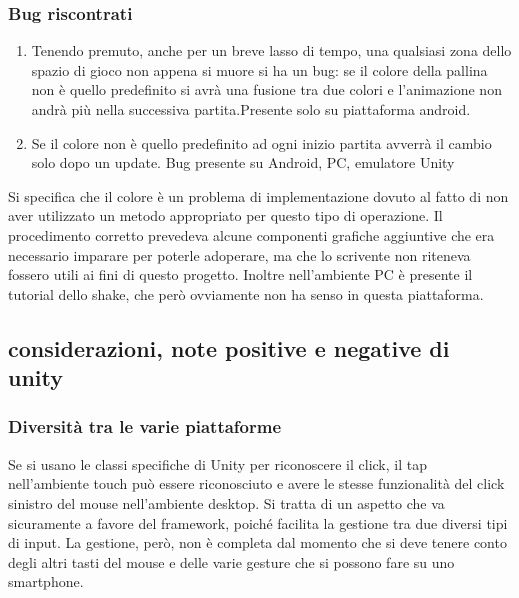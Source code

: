 \subsubsection{Bug riscontrati}
\begin{enumerate}
\item Tenendo premuto, anche per un breve lasso di tempo, una qualsiasi zona dello spazio di gioco non appena si muore si ha un bug: se il colore della pallina non è quello predefinito si avrà una fusione tra due colori e l’animazione non andrà più nella successiva partita.Presente solo su piattaforma android.
\item Se il colore non è quello predefinito ad ogni inizio partita avverrà il cambio solo dopo un update. Bug presente su Android, PC, emulatore Unity
\end{enumerate}

Si specifica che il colore è un problema di implementazione dovuto al fatto di non aver utilizzato un metodo appropriato per questo tipo di operazione. Il procedimento corretto prevedeva alcune componenti grafiche aggiuntive che era necessario imparare per poterle adoperare, ma che lo scrivente non riteneva fossero utili ai fini di questo progetto. Inoltre nell’ambiente PC è presente il tutorial dello shake, che però ovviamente non ha senso in questa piattaforma.



\subsection{considerazioni, note positive e negative di unity}

\subsubsection{Diversità tra le varie piattaforme}
Se si usano le classi specifiche di Unity per riconoscere il click, il tap nell’ambiente touch può essere riconosciuto e avere le stesse funzionalità del click sinistro del mouse nell’ambiente desktop. Si tratta di un aspetto che va sicuramente a favore del framework, poiché facilita la gestione tra due diversi tipi di input. La gestione, però, non è completa dal momento che si deve tenere conto degli altri tasti del mouse e delle varie gesture che si possono fare su uno smartphone.

